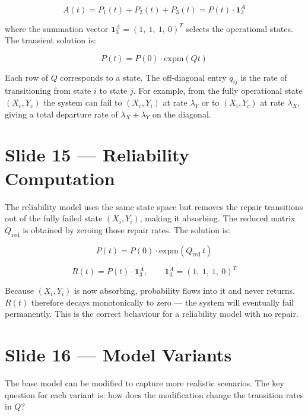\[
    A(t) = P_1(t) + P_2(t) + P_3(t) = P(t) \cdot \mathbf{1}_3^A
\]

where the summation vector $\mathbf{1}_3^A = (1,\ 1,\ 1,\ 0)^T$ 
selects the operational states. The transient solution is:

\[
    P(t) = P(0) \cdot \mathrm{expm}(Qt)
\]

\begin{notebox}
    Each row of $Q$ corresponds to a state. The off-diagonal entry 
    $q_{ij}$ is the rate of transitioning from state $i$ to state $j$. 
    For example, from the fully operational state $(X_c, Y_c)$ the 
    system can fail to $(X_c, Y_i)$ at rate $\lambda_Y$ or to 
    $(X_i, Y_c)$ at rate $\lambda_X$, giving a total departure rate 
    of $\lambda_X + \lambda_Y$ on the diagonal.
\end{notebox}

\section*{Slide 15 — Reliability Computation}

The reliability model uses the same state space but removes the 
repair transitions out of the fully failed state $(X_i, Y_i)$, 
making it absorbing. The reduced matrix $Q_{\mathrm{red}}$ is 
obtained by zeroing those repair rates. The solution is:

\[
    P(t) = P(0) \cdot \mathrm{expm}(Q_{\mathrm{red}}\, t)
\]

\[
    R(t) = P(t) \cdot \mathbf{1}_3^A, 
    \qquad \mathbf{1}_3^A = (1,\ 1,\ 1,\ 0)^T
\]

\begin{warnbox}
    Because $(X_i, Y_i)$ is now absorbing, probability flows into 
    it and never returns. $R(t)$ therefore decays monotonically to 
    zero --- the system will eventually fail permanently. This is 
    the correct behaviour for a reliability model with no repair.
\end{warnbox}

\section*{Slide 16 — Model Variants}

The base model can be modified to capture more realistic scenarios. 
The key question for each variant is: how does the modification 
change the transition rates in $Q$?

